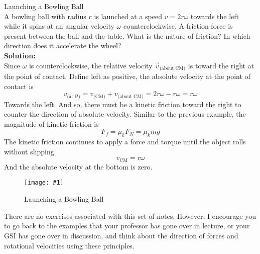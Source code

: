 \documentclass[11pt]{article}
\newcommand{\fig}[4]{
    \begin{figure}[H]
        \centering
        \texttt{[image: \#1]}
        \caption{#2}
        \label{exp4fit}
    \end{figure}
}
\theoremstyle{gangnamstyle}{\newtheorem{definition}{Definition}[]}
\theoremstyle{gangnamstyle}{\newtheorem{example}{Example}[]}
\theoremstyle{gangnamstyle}{\newtheorem{problem}{Problem}[]}
\theoremstyle{gangnamstyle}{\newtheorem{warning}{Warning}[]}
\begin{document}
\begin{example}
Launching a Bowling Ball \\
A bowling ball with radius $r$ is launched at a speed $v = 2r\omega$ towards the left while it spins at an angular velocity $\omega$ counterclockwise. A friction force is present between the ball and the table. What is the nature of friction? In which direction does it accelerate the wheel? \\

\textbf{Solution:} \\
Since $\omega$ is counterclockwise, the relative velocity $\Vec{v}_{\text{(about CM)}}$ is toward the right at the point of contact. Define left as positive, the absolute velocity at the point of contact is
\[ v_{\text{(at P)}} = v_{\text{(CM)}} + v_{\text{(about CM)}} = 2r\omega - r\omega = r\omega \]
Towards the left. And so, there must be a kinetic friction toward the right to counter the direction of absolute velocity. Similar to the previous example, the magnitude of kinetic friction is
\[ F_f = \mu_kF_N = \mu_kmg \]
The kinetic friction continues to apply a force and torque until the object rolls without slipping
\[ v_{\text{CM}} = r\omega \]
And the absolute velocity at the bottom is zero. 
\fig{figs/n8/bowling.jpeg}{Launching a Bowling Ball}{0.125}{0}
\end{example}

There are no exercises associated with this set of notes. However, I encourage you to go back to the examples that your professor has gone over in lecture, or your GSI has gone over in discussion, and think about the direction of forces and rotational velocities using these principles. 
\end{document}
